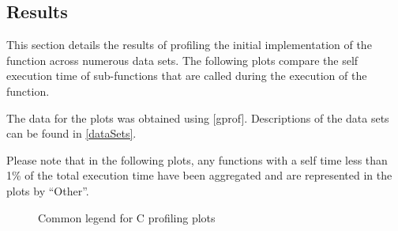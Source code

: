 
\subsection{Results}
\label{software:algorithmProfiling:c:results}
This section details the results of profiling the initial 
implementation of the  function across
numerous data sets. The following plots compare the self execution time of
sub-functions that are called during the execution of the
 function.

The data for the plots was obtained using [gprof].
Descriptions of the data sets can be found in \autoref{dataSets}.

Please note that in the following plots, any functions with a self time less
than 1\% of the total execution time have been aggregated and are represented in
the plots by ``Other''.


\begin{figure}
    \centering
    
    \caption{Common legend for C profiling plots}
    \label{profiling:c:legend}
\end{figure}
